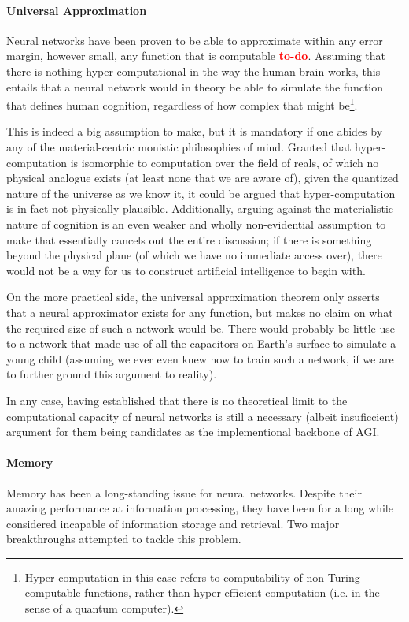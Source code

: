 \documentclass[]{article}
\newcommand\todo{\textcolor{red}{\bf{to-do}}}
\begin{document}
\paragraph{Universal Approximation}
Neural networks have been proven to be able to approximate within any error margin, however small, any function that is computable \todo . Assuming that there is nothing hyper-computational in the way the human brain works, this entails that a neural network would in theory be able to simulate the function that defines human cognition, regardless of how complex that might be\footnote{Hyper-computation in this case refers to computability of non-Turing-computable functions, rather than hyper-efficient computation (i.e. in the sense of a quantum computer).}. 

This is indeed a big assumption to make, but it is mandatory if one abides by any of the material-centric monistic philosophies of mind. Granted that hyper-computation is isomorphic to computation over the field of reals, of which no physical analogue exists (at least none that we are aware of), given the quantized nature of the universe as we know it, it could be argued that hyper-computation is in fact not physically plausible. Additionally, arguing against the materialistic nature of cognition is an even weaker and wholly non-evidential assumption to make that essentially cancels out the entire discussion; if there is something beyond the physical plane (of which we have no immediate access over), there would not be a way for us to construct artificial intelligence to begin with.

On the more practical side, the universal approximation theorem only asserts that a neural approximator exists for any function, but makes no claim on what the required size of such a network would be. There would probably be little use to a network that made use of all the capacitors on Earth's surface to simulate a young child (assuming we ever even knew how to train such a network, if we are to further ground this argument to reality). 

In any case, having established that there is no theoretical limit to the computational capacity of neural networks is still a necessary (albeit insuficcient) argument for them being candidates as the implementional backbone of AGI.

\paragraph{Memory}
Memory has been a long-standing issue for neural networks. Despite their amazing performance at information processing, they have been for a long while considered incapable of information storage and retrieval. Two major breakthroughs attempted to tackle this problem.
\end{document}
